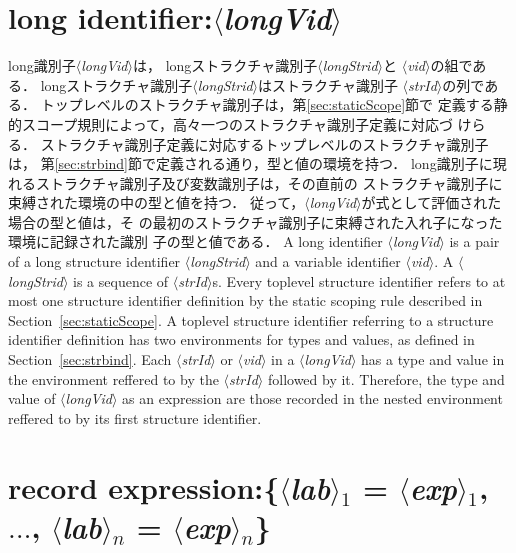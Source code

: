 \documentclass{jbook}
\newcommand{\txt}[2]{#2}
\newcommand{\nonterm}[1]{\mbox{$\langle$}{\it #1}\mbox{$\rangle$}}
\begin{document}
\section{\txt{long識別子}{long identifier}:\nonterm{longVid}}

\ifjp%
	long識別子\nonterm{longVid}は，
longストラクチャ識別子\nonterm{longStrid}と
\nonterm{vid}の組である．
	longストラクチャ識別子\nonterm{longStrid}はストラクチャ識別子
\nonterm{strId}の列である．
	トップレベルのストラクチャ識別子は，第\ref{sec:staticScope}節で
定義する静的スコープ規則によって，高々一つのストラクチャ識別子定義に対応づ
けらる．
	ストラクチャ識別子定義に対応するトップレベルのストラクチャ識別子は，
第\ref{sec:strbind}節で定義される通り，型と値の環境を持つ．
	long識別子に現れるストラクチャ識別子及び変数識別子は，その直前の
ストラクチャ識別子に束縛された環境の中の型と値を持つ．
	従って，\nonterm{longVid}が式として評価された場合の型と値は，そ
の最初のストラクチャ識別子に束縛された入れ子になった環境に記録された識別
子の型と値である．
\else%
	A long identifier \nonterm{longVid} is a pair of a long structure
identifier \nonterm{longStrid} and a variable identifier \nonterm{vid}.
	A \nonterm{longStrid} is a sequence of \nonterm{strId}s.
	Every toplevel structure identifier refers to at most one
structure identifier definition by the static scoping rule
described in Section~\ref{sec:staticScope}.
	A toplevel structure identifier referring to a structure
identifier definition has two environments for types and values,
as defined in Section~\ref{sec:strbind}.
	Each \nonterm{strId} or \nonterm{vid} in a \nonterm{longVid}
has a type and value in the environment reffered to by
the \nonterm{strId} followed by it.
	Therefore, the type and value of \nonterm{longVid} as an
expression are those recorded in the nested environment reffered to
by its first structure identifier.

\fi%

\section{\txt{レコード式}{record expression}:\{\nonterm{lab}$_1$ = \nonterm{exp}$_1$, $\ldots$, \nonterm{lab}$_n$ = \nonterm{exp}$_n$\}}

\ifjp%
\end{document}
